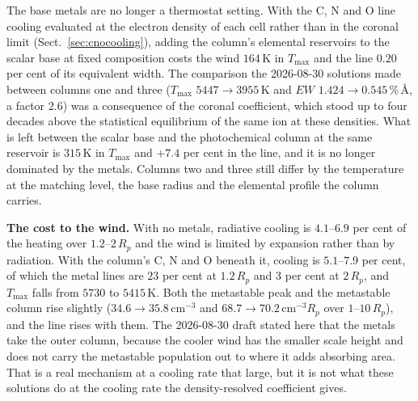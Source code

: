 \documentclass[english,a4paper]{my_memo}
\begin{document}
\medskip
\noindent The base metals are no longer a thermostat setting. With the C, N
and O line cooling evaluated at the electron density of each cell rather than
in the coronal limit (Sect.~\ref{sec:cnocooling}), adding the column's
elemental reservoirs to the scalar base at fixed composition costs the wind
$164$\,K in $T_{\max}$ and the line $0.20$ per cent of its equivalent width.
The comparison the 2026-08-30 solutions made between columns one and three
($T_{\max}$ $5447 \rightarrow 3955$\,K and $EW$
$1.424 \rightarrow 0.545$\,\%\,\AA, a factor $2.6$) was a consequence of the
coronal coefficient, which stood up to four decades above the statistical
equilibrium of the same ion at these densities. What is left between the
scalar base and the photochemical column at the same reservoir is $315$\,K in
$T_{\max}$ and $+7.4$ per cent in the line, and it is no longer dominated by
the metals. Columns two and three still differ by the temperature at the
matching level, the base radius and the elemental profile the column carries.

\medskip
\noindent\textbf{The cost to the wind.} With no metals, radiative cooling is
$4.1$--$6.9$ per cent of the heating over $1.2$--$2\,R_p$ and the wind is
limited by expansion rather than by radiation. With the column's C, N and O
beneath it, cooling is $5.1$--$7.9$ per cent, of which the metal lines are
$23$ per cent at $1.2\,R_p$ and $3$ per cent at $2\,R_p$, and $T_{\max}$
falls from $5730$ to $5415$\,K. Both the metastable peak and the metastable
column rise slightly ($34.6 \rightarrow 35.8$\,cm$^{-3}$ and
$68.7 \rightarrow 70.2$\,cm$^{-3}R_p$ over $1$--$10\,R_p$), and the line
rises with them. The 2026-08-30 draft stated here that the metals take the
outer column, because the cooler wind has the smaller scale height and does
not carry the metastable population out to where it adds absorbing area. That
is a real mechanism at a cooling rate that large, but it is not what these
solutions do at the cooling rate the density-resolved coefficient gives.
\end{document}

